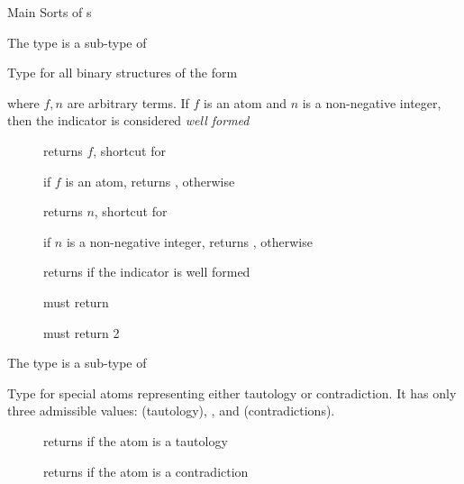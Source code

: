 \documentclass[handout]{beamer}
\begin{document}
\begin{frame}[allowframebreaks]{Main Sorts of s}

    \framebreak

    \begin{block}{The  type is a sub-type of }
        \begin{center}
            Type for all binary structures of the form
            \begin{center}
            \end{center}
            where $f,n$ are arbitrary terms. If $f$ is an atom and $n$ is a non-negative integer, then the indicator is considered \emph{well formed}
        \end{center}
    \end{block}
    \begin{description}
        \item[] returns $f$, shortcut for 
        \item[] if $f$ is an atom, returns , otherwise 
        \item[] returns $n$, shortcut for 
        \item[] if $n$ is a non-negative integer, returns , otherwise 
        \item[] returns  if the indicator is well formed
        \item[] must return 
        \item[] must return 2
    \end{description}


    \framebreak

    \begin{block}{The  type is a sub-type of }
        \begin{center}
            Type for special atoms representing either tautology or contradiction.
            It has only three admissible values:  (tautology), , and  (contradictions).
        \end{center}
    \end{block}
    \begin{description}
        \item[] returns  if the atom is a tautology
        \item[] returns  if the atom is a contradiction
    \end{description}

\end{frame}
\end{document}
